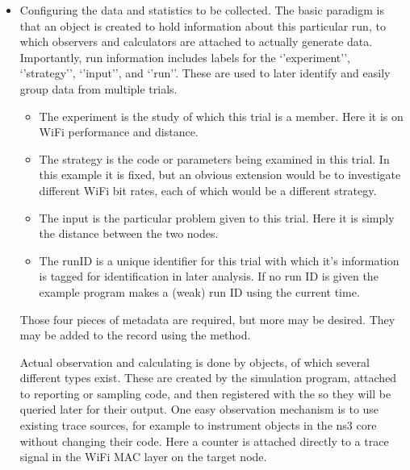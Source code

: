 \documentclass[letterpaper,10pt,english]{sphinxmanual}
\renewcommand{\sphinxcode}[1]{\texttt{\small{#1}}}
\begin{document}
\begin{itemize}
\item {} 
Configuring the data and statistics to be collected.  The basic paradigm is that an \sphinxcode{} object is created to hold information about this particular run, to which observers and calculators are attached to actually generate data.  Importantly, run information includes labels for the ‘’experiment’’, ‘’strategy’’, ‘’input’’, and ‘’run’’.  These are used to later identify and easily group data from multiple trials.
\begin{itemize}
\item {} 
The experiment is the study of which this trial is a member.  Here it is on WiFi performance and distance.

\item {} 
The strategy is the code or parameters being examined in this trial.  In this example it is fixed, but an obvious extension would be to investigate different WiFi bit rates, each of which would be a different strategy.

\item {} 
The input is the particular problem given to this trial.  Here it is simply the distance between the two nodes.

\item {} 
The runID is a unique identifier for this trial with which it’s information is tagged for identification in later analysis.  If no run ID is given the example program makes a (weak) run ID using the current time.

\end{itemize}

Those four pieces of metadata are required, but more may be desired.  They may be added to the record using the \sphinxcode{} method.

\begin{sphinxVerbatim}[commandchars=\\\{\}]
 
   
 
\end{sphinxVerbatim}

Actual observation and calculating is done by \sphinxcode{} objects, of which several different types exist.  These are created by the simulation program, attached to reporting or sampling code, and then registered with the \sphinxcode{} so they will be queried later for their output.  One easy observation mechanism is to use existing trace sources, for example to instrument objects in the ns\sphinxhyphen{}3 core without changing their code.  Here a counter is attached directly to a trace signal in the WiFi MAC layer on the target node.


\end{itemize}
\end{document}
